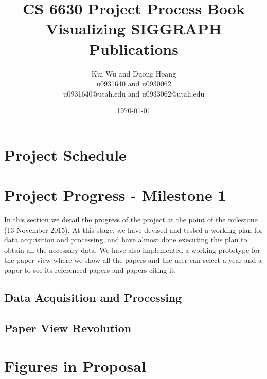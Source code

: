 \documentclass[12pt]{article}
\begin{document}

\title{CS 6630 Project Process Book\\Visualizing SIGGRAPH Publications}
\author{Kui Wu and Duong Hoang\\u0931640 and u0930062\\u0931640@utah.edu and u0933062@utah.edu}
\date{\today}



\maketitle



\section{Project Schedule}


\section{Project Progress - Milestone 1}
In this section we detail the progress of the project at the point of the milestone (13 November 2015). At this stage, we have devised and tested a working plan for data acquisition and processing, and have almost done executing this plan to obtain all the necessary data. We have also implemented a working prototype for the paper view where we show all the papers and the user can select a year and a paper to see its referenced papers and papers citing it.

\subsection{Data Acquisition and Processing}


\subsection{Paper View Revolution}


\newpage
\appendix
\section{Figures in Proposal}

\end{document}
